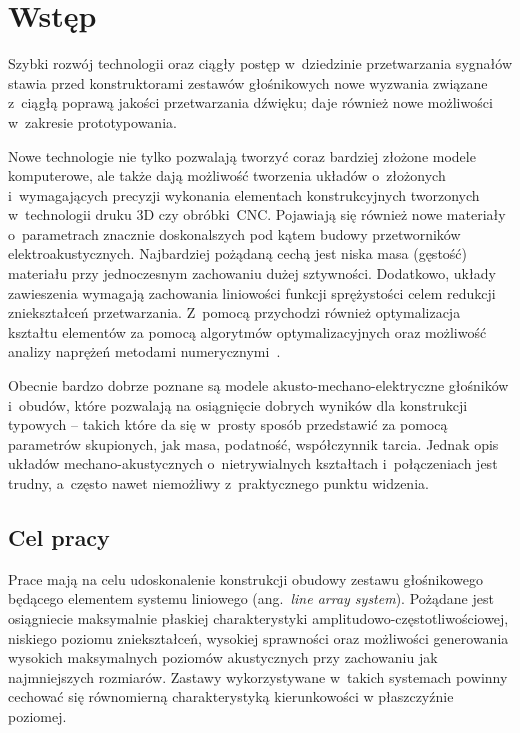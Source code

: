 \documentclass[12pt]{oska}
\affiliation{Akademia Górniczo-Hutnicza im. S. Staszica w Krakowie}
\begin{document}
	
	\maketitles
	
	\section{Wstęp}
	
	Szybki rozwój technologii oraz ciągły postęp w~dziedzinie przetwarzania sygnałów stawia przed konstruktorami zestawów głośnikowych nowe wyzwania związane z~ciągłą poprawą jakości przetwarzania dźwięku; daje również nowe możliwości w~zakresie prototypowania. 
	
	Nowe technologie nie tylko pozwalają tworzyć coraz bardziej złożone modele komputerowe, ale także dają możliwość tworzenia układów o~złożonych i~wymagających precyzji wykonania elementach konstrukcyjnych tworzonych w~technologii druku 3D czy obróbki~CNC. Pojawiają się również nowe materiały o~parametrach znacznie doskonalszych pod kątem budowy przetworników elektroakustycznych. Najbardziej pożądaną cechą jest niska masa (gęstość) materiału przy jednoczesnym zachowaniu dużej sztywności. Dodatkowo, układy zawieszenia wymagają zachowania liniowości funkcji sprężystości celem redukcji zniekształceń przetwarzania. Z~pomocą przychodzi również optymalizacja kształtu elementów za pomocą algorytmów optymalizacyjnych oraz możliwość analizy naprężeń metodami numerycznymi~\cite{naprezenia}.
	
	Obecnie bardzo dobrze poznane są modele akusto-mechano-elektryczne głośników i~obudów, które pozwalają na osiągnięcie dobrych wyników dla konstrukcji typowych -- takich które da się w~prosty sposób przedstawić za pomocą parametrów skupionych, jak masa, podatność, współczynnik tarcia. Jednak opis układów mechano-akustycznych o~nietrywialnych kształtach i~połączeniach jest trudny, a~często nawet niemożliwy z~praktycznego punktu widzenia.
	
	\subsection{Cel pracy}
	
	Prace mają na celu udoskonalenie konstrukcji obudowy zestawu głośnikowego będącego elementem systemu liniowego (ang.~\textit{line array system}). Pożądane jest osiągniecie maksymalnie płaskiej charakterystyki amplitudowo-częstotliwościowej, niskiego poziomu zniekształceń, wysokiej sprawności oraz możliwości generowania wysokich maksymalnych poziomów akustycznych przy zachowaniu jak najmniejszych rozmiarów. Zastawy wykorzystywane w~takich systemach powinny cechować się równomierną charakterystyką kierunkowości w płaszczyźnie poziomej.
	
\end{document}
